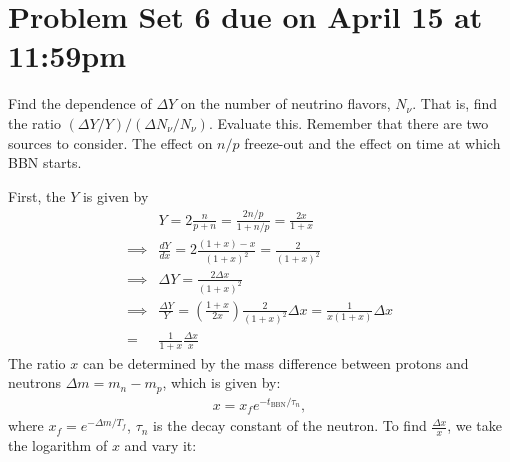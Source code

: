 \section*{Problem Set 6 due on April 15 at 11:59pm}
Find the dependence of $\Delta Y$ on the number of neutrino flavors, $N_\nu$. That is, find the ratio $(\Delta Y/Y)/(\Delta N_\nu / N_\nu)$. Evaluate this. Remember that there are two sources to consider. The effect on $n/p$ freeze-out and the effect on time at which BBN starts.


\answer{}
First, the $Y$ is given by 
\begin{align}
    &Y= 2\frac{n}{p+n}=\frac{2n/p}{1+n/p}=\frac{2x}{1+x}\\
    \implies& \frac{dY}{dx}=2\frac{(1+x)-x}{(1+x)^2}=\frac{2}{(1+x)^2}\\
    \implies& \Delta Y = \frac{2 \Delta x}{ (1+x)^2}\\
    \implies& \frac{\Delta Y}{ Y } =\left( \frac{1+x}{2x} \right) \frac{2}{(1+x)^2} \Delta x = \frac{1}{x(1+x)} \Delta x \\
    =& \frac{1}{1+x} \frac{\Delta x}{x}
\end{align}
The ratio $x$ can be determined by the mass difference  between protons and neutrons $\Delta m = m_n-m_p$, which is given by:
\begin{align}
    x=x_f e^{-t_\text{BBN}/\tau_n},
\end{align}
where $x_f=e^{-\Delta m/T_f}$, $\tau_n$ is the decay constant of the neutron. To find $\frac{\Delta x}{x}$, we take the logarithm of $x$ and vary it:

